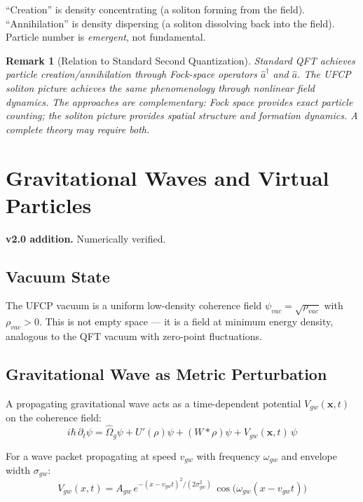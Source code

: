 \documentclass[11pt, a4paper]{article}
\newtheorem{remark}{Remark}[section]
\begin{document}
``Creation'' is density concentrating (a soliton forming from the field).
``Annihilation'' is density dispersing (a soliton dissolving back into
the field). Particle number is \textit{emergent}, not fundamental.

\begin{remark}[Relation to Standard Second Quantization]
Standard QFT achieves particle creation/annihilation through Fock-space
operators $\hat{a}^\dagger$ and $\hat{a}$. The UFCP soliton picture
achieves the same phenomenology through nonlinear field dynamics. The
approaches are complementary: Fock space provides exact particle
counting; the soliton picture provides spatial structure and formation
dynamics. A complete theory may require both.
\end{remark}

\section{Gravitational Waves and Virtual Particles}
\label{sec:gw-virtual}

\textbf{v2.0 addition.} Numerically verified.

\subsection{Vacuum State}

The UFCP vacuum is a uniform low-density coherence field
$\psi_{vac} = \sqrt{\rho_{vac}}$ with $\rho_{vac} > 0$. This is not
empty space --- it is a field at minimum energy density, analogous to
the QFT vacuum with zero-point fluctuations.

\subsection{Gravitational Wave as Metric Perturbation}

A propagating gravitational wave acts as a time-dependent potential
$V_{gw}(\mathbf{x}, t)$ on the coherence field:
\begin{equation}
  i\hbar\,\partial_t\psi = \hat{\Omega}_g\psi + U'(\rho)\psi
    + (W*\rho)\psi + V_{gw}(\mathbf{x},t)\,\psi
  \label{eq:eom-gw}
\end{equation}

For a wave packet propagating at speed $v_{gw}$ with frequency
$\omega_{gw}$ and envelope width $\sigma_{gw}$:
\begin{equation}
  V_{gw}(x, t) = A_{gw}\, e^{-(x - v_{gw}t)^2/(2\sigma_{gw}^2)}\,
  \cos\!\big(\omega_{gw}(x - v_{gw}t)\big)
\end{equation}
\end{document}
